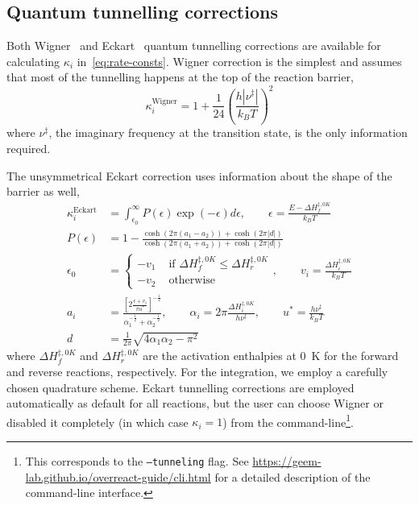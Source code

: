 \subsection{Quantum tunnelling corrections}

Both Wigner~\cite{Wigner_1932} and Eckart~\cite{Eckart_1930} quantum tunnelling corrections are available for calculating $\kappa_i$ in~\cref{eq:rate-consts}.
Wigner correction is the simplest and assumes that most of the tunnelling happens at the top of the reaction barrier,
% 
\begin{equation}
	\kappa_i^\text{Wigner}
	= 1 + \frac{1}{24}
	\left(
	\frac{
		h | \nu^\ddagger |
	}{k_B T}
	\right)^2
\end{equation}
% 
where $\nu^\ddagger$,
the imaginary frequency at the transition state,
is the only information required.

The unsymmetrical Eckart correction uses information about the shape of the barrier as well,
% 
\begin{equation}
	\begin{split}
		\kappa_i^\text{Eckart}
		&= \int_{\epsilon_0}^\infty
		P(\epsilon) \exp \left(
		-\epsilon
		\right) d \epsilon,
		\qquad
		\epsilon
		= \frac{E - \Delta H^{\ddagger,
					0 K}_f}{k_B T} \\
		P(\epsilon)
		&= 1
		- \frac{
			\cosh \left(
			2 \pi (a_1 - a_2)
			\right)
			+ \cosh \left(
			2 \pi |d|
			\right)
		}{
			\cosh \left(
			2 \pi (a_1 + a_2)
			\right)
			+ \cosh \left(
			2 \pi |d|
			\right)
		} \\
		\epsilon_0 &= \begin{cases}
			-v_1 & \text{ if }
			\Delta H^{\ddagger,
					0 K}_f \le \Delta H^{\ddagger,
			0 K}_r                   \\
			-v_2 & \text{ otherwise}
		\end{cases},
		\qquad
		v_i
		= \frac{\Delta H^{\ddagger,
					0 K}_i}{k_B T} \\
		a_i
		&= \frac{
			\left[
				2
				\frac{
					\epsilon + v_i
				}{\pi u^*}
				\right]^{-\frac{1}{2}}
		}{
			\alpha_1^{-\frac{1}{2}}
			+ \alpha_2^{-\frac{1}{2}}
		},
		\qquad
		\alpha_i
		= 2 \pi \frac{
			\Delta H^{\ddagger,
					0 K}_i
		}{
			h \nu^\ddagger
		},
		\qquad
		u^*
		= \frac{
			h \nu^\ddagger
		}{
			k_B T
		} \\
		d
		&= \frac{1}{2 \pi}
		\sqrt{
			4 \alpha_1 \alpha_2 - \pi^2
		}
	\end{split}
\end{equation}
% 
where $\Delta H^{\ddagger,
			0 K}_f$ and $\Delta H^{\ddagger,
			0 K}_r$ are the activation enthalpies at 0~K for the forward and reverse reactions,
respectively.
For the integration,
we employ a carefully chosen quadrature scheme.
Eckart tunnelling corrections are employed automatically as default for all reactions,
but the user can choose Wigner or disabled it completely (in which case $\kappa_i = 1$) from the command-line\footnote{This corresponds to the \texttt{--tunneling} flag.
	See \url{https://geem-lab.github.io/overreact-guide/cli.html} for a detailed description of the command-line interface.}.

